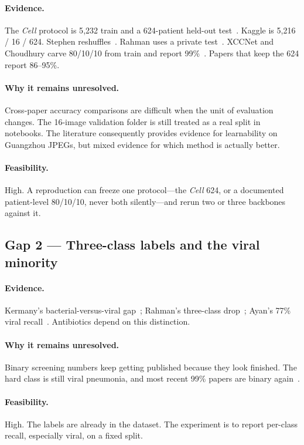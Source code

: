 \documentclass[11pt,a4paper]{article}
\begin{document}
\paragraph{Evidence.}
The \textit{Cell} protocol is 5{,}232 train and a 624-patient held-out test~\cite{kermany2018}. Kaggle is 5{,}216 / 16 / 624. Stephen reshuffles~\cite{stephen2019}. Rahman uses a private test~\cite{rahman2020}. XCCNet and Choudhury carve 80/10/10 from train and report 99\%~\cite{raghaw2024,choudhury2026}. Papers that keep the 624 report 86--95\%.

\paragraph{Why it remains unresolved.}
Cross-paper accuracy comparisons are difficult when the unit of evaluation changes. The 16-image validation folder is still treated as a real split in notebooks. The literature consequently provides evidence for learnability on Guangzhou JPEGs, but mixed evidence for which method is actually better.

\paragraph{Feasibility.}
High. A reproduction can freeze one protocol---the \textit{Cell} 624, or a documented patient-level 80/10/10, never both silently---and rerun two or three backbones against it.

\subsection{Gap 2 --- Three-class labels and the viral minority}
\paragraph{Evidence.}
Kermany's bacterial-versus-viral gap~\cite{kermany2018}; Rahman's three-class drop~\cite{rahman2020}; Ayan's 77\% viral recall~\cite{ayan2021}. Antibiotics depend on this distinction.

\paragraph{Why it remains unresolved.}
Binary screening numbers keep getting published because they look finished. The hard class is still viral pneumonia, and most recent 99\% papers are binary again~\cite{raghaw2024,chauhan2025,choudhury2026}.

\paragraph{Feasibility.}
High. The labels are already in the dataset. The experiment is to report per-class recall, especially viral, on a fixed split.
\end{document}
